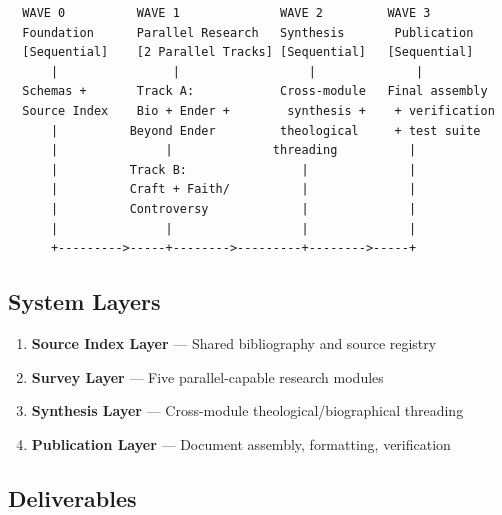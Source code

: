 \documentclass[11pt,letterpaper]{article}
\begin{document}
\begin{asciibox}
\begin{verbatim}
  WAVE 0          WAVE 1              WAVE 2         WAVE 3
  Foundation      Parallel Research   Synthesis       Publication
  [Sequential]    [2 Parallel Tracks] [Sequential]   [Sequential]
      |                |                  |              |
  Schemas +       Track A:            Cross-module   Final assembly
  Source Index    Bio + Ender +        synthesis +    + verification
      |          Beyond Ender         theological     + test suite
      |               |              threading          |
      |          Track B:                |              |
      |          Craft + Faith/          |              |
      |          Controversy             |              |
      |               |                  |              |
      +--------->-----+-------->---------+-------->-----+
\end{verbatim}
\end{asciibox}

\subsection{System Layers}

\begin{enumerate}[leftmargin=2em]
  \item \textbf{Source Index Layer} --- Shared bibliography and source registry
  \item \textbf{Survey Layer} --- Five parallel-capable research modules
  \item \textbf{Synthesis Layer} --- Cross-module theological/biographical threading
  \item \textbf{Publication Layer} --- Document assembly, formatting, verification
\end{enumerate}

\subsection{Deliverables}
\end{document}
